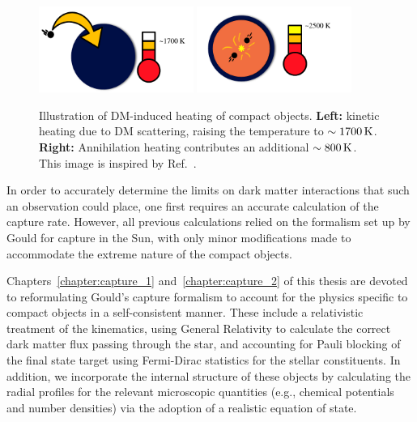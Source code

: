 \begin{figure}[!t]
    \centering
    \includegraphics[width=0.45\textwidth]{img/chapter_1/kin_heat_NS.pdf}
    \includegraphics[width=0.45\textwidth]{img/chapter_1/ann_heat_NS.pdf}
    \caption{Illustration of DM-induced heating of compact objects. \textbf{Left:} kinetic heating due to DM scattering, raising the temperature to $\sim 1700 {\rm \,K}$. \textbf{Right:} Annihilation heating contributes an additional $\sim 800{\rm \,K}$. This image is inspired by Ref.~\cite{Raj:2017wrv_feb_Neutronstarsdark}.}
    \label{fig:cartoon_NS_heat}
\end{figure}

In order to accurately determine the limits on dark matter interactions that such an observation could place, one first requires an accurate calculation of the capture rate. However, all previous calculations relied on the formalism set up by Gould for capture in the Sun, with only minor modifications made to accommodate the extreme nature of the compact objects. 

Chapters~\ref{chapter:capture_1} and~\ref{chapter:capture_2} of this thesis are devoted to reformulating Gould's capture formalism to account for the physics specific to compact objects in a self-consistent manner. These include a relativistic treatment of the kinematics, using General Relativity to calculate the correct dark matter flux passing through the star, and accounting for Pauli blocking of the final state target using Fermi-Dirac statistics for the stellar constituents. In addition, we incorporate the internal structure of these objects by calculating the radial profiles for the relevant microscopic quantities (e.g., chemical potentials and number densities) via the adoption of a realistic equation of state.

